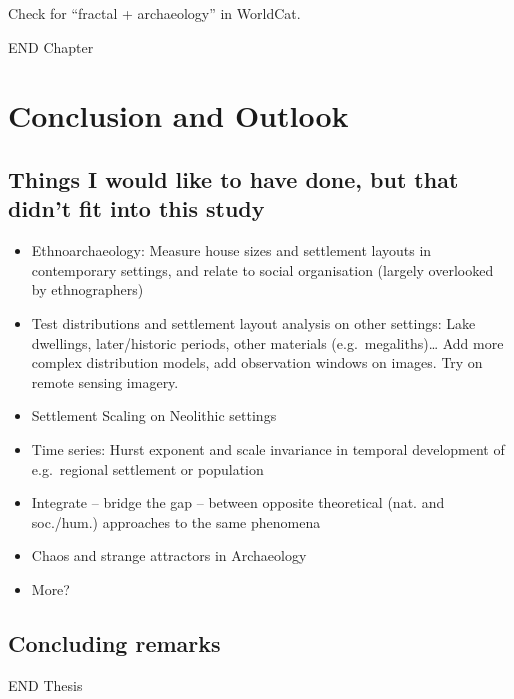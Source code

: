 \documentclass[
  12pt,
]{book}
\providecommand{\tightlist}{%
  \setlength{\itemsep}{0pt}\setlength{\parskip}{0pt}}
\begin{document}
Check for ``fractal + archaeology'' in WorldCat.

END Chapter

\hypertarget{conclusion}{%
\chapter{Conclusion and Outlook}\label{conclusion}}

\hypertarget{things-i-would-like-to-have-done-but-that-didnt-fit-into-this-study}{%
\section{Things I would like to have done, but that didn't fit into this study}\label{things-i-would-like-to-have-done-but-that-didnt-fit-into-this-study}}

\begin{itemize}
\tightlist
\item
  Ethnoarchaeology: Measure house sizes and settlement layouts in contemporary settings, and relate to social organisation (largely overlooked by ethnographers)
\item
  Test distributions and settlement layout analysis on other settings: Lake dwellings, later/historic periods, other materials (e.g.~megaliths)\ldots{} Add more complex distribution models, add observation windows on images. Try on remote sensing imagery.
\item
  Settlement Scaling on Neolithic settings
\item
  Time series: Hurst exponent and scale invariance in temporal development of e.g.~regional settlement or population
\item
  Integrate -- bridge the gap -- between opposite theoretical (nat. and soc./hum.) approaches to the same phenomena
\item
  Chaos and strange attractors in Archaeology
\item
  More?
\end{itemize}

\hypertarget{concluding-remarks-1}{%
\section{Concluding remarks}\label{concluding-remarks-1}}

END Thesis
\end{document}
